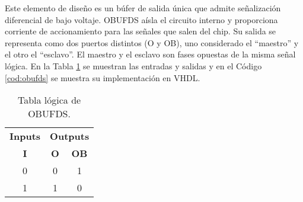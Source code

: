                 Este elemento de diseño es un búfer de salida única que admite señalización diferencial de bajo voltaje. OBUFDS aísla el circuito interno y proporciona corriente de accionamiento para las señales que salen del chip. Su salida se representa como dos puertos distintos (O y OB), uno considerado el ``maestro'' y el otro el ``esclavo''. El maestro y el esclavo son fases opuestas de la misma señal lógica.  En la Tabla \ref{tab:obufds} se muestran las entradas y salidas y en el Código \ref{cod:obufds} se muestra su implementación en VHDL.
                
                \begin{table}[htbp]
                    \centering
                    \caption{Tabla lógica de OBUFDS.}
                    \begin{tabular}{|c|cc|}
                        \hline
                        \textbf{Inputs} & \multicolumn{2}{c|}{\textbf{Outputs}} \\ 
                        \textbf{I}      & \multicolumn{1}{c}{\textbf{O}}  & \textbf{OB} \\ 
                        \hline
                        0      & \multicolumn{1}{c|}{0}  & 1  \\ \hline
                        1      & \multicolumn{1}{c|}{1}  & 0  \\ \hline
                    \end{tabular}
                    \label{tab:obufds}
                \end{table}

                \vspace{0.4cm}
                

